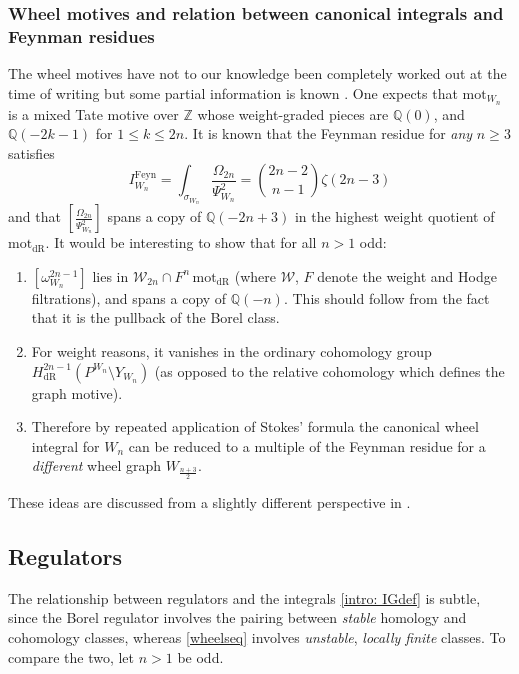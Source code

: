 \documentclass[10pt]{amsart}
\newcommand{\QQ}{{\mathbb Q}}
\newcommand{\ZZ}{{\mathbb Z}}
\theoremstyle{plain}
\newcommand{\0}{\color{blue}{\mathsf{0}}}
\begin{document}
\subsubsection{Wheel motives and relation between canonical integrals and Feynman residues}
The wheel motives have not to our knowledge been completely worked out at the time of writing but some partial information is known \cite{BEK}. One expects that $\mathrm{mot}_{W_n}$ is a mixed Tate motive over $\ZZ$ whose weight-graded pieces are $\QQ(0)$, and $\QQ(-2k-1)$ for $1\leq k\leq 2n.$
It is known that the Feynman residue for \emph{any} $n\geq 3$ satisfies \begin{equation} \label{IFeynWndef} I^{\mathrm{Feyn}}_{W_n} =  \int_{\sigma_{W_n}}  \frac{\Omega_{2n}}{\Psi^2_{W_n}}  = \genfrac(){0pt}{}{2n-2}{n-1}\zeta(2n-3)  \end{equation}
and that $[ \frac{\Omega_{2n}}{\Psi^2_{W_n}}]$ spans a copy of $\QQ(-2n+3)$ in the highest weight  quotient of $\mathrm{mot}_ {\mathrm{dR}}$. 
It would be interesting to show that for all $n>1$  odd: \vspace{0.05in}
\begin{enumerate} 
\item $ [\omega^{2n-1}_{W_n} ]$ lies in $\mathcal{W}_{2n} \cap F^n \,  \mathrm{mot}_ {\mathrm{dR}}$ (where $\mathcal{W}$, $F$ denote the weight and Hodge filtrations), and spans a copy of $\QQ(-n)$. This should follow from the fact that  it is the pullback of the Borel class.   \vspace{0.05in}

\item For weight reasons, it vanishes in the  ordinary   cohomology group $H_ {\mathrm{dR}}^{2n-1} \left(P^{W_n} \setminus Y_{W_n}\right)$ (as opposed to the relative cohomology which defines the graph motive). 
\vspace{0.05in}

\item Therefore  by repeated application of Stokes' formula \cite{BrSigma} the canonical wheel integral for $W_n$ can be reduced to a multiple of the Feynman residue for a \emph{different} wheel graph $W_{\frac{n+3}{2}}$. 
\vspace{0.05in}
\end{enumerate}

These ideas are discussed from a slightly different perspective in \cite[\S9.5.1]{BrSigma}. 
\subsection{Regulators} 
The relationship between regulators and the integrals \eqref{intro: IGdef} is subtle, since the Borel regulator involves the pairing between \emph{stable} homology and cohomology classes, whereas \eqref{wheelseq}  involves \emph{unstable}, \emph{locally finite} classes. To compare the two,  let $n>1$ be odd. 
\end{document}
